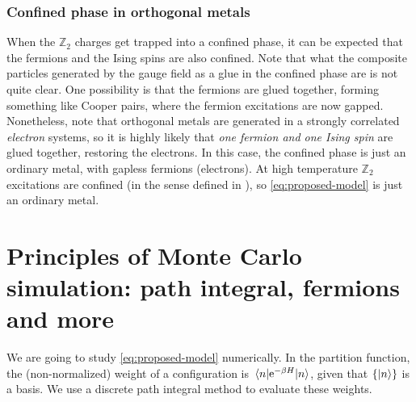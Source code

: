 \documentclass[hyperref, a4paper]{article}
\newcommand*{\ee}{\mathrm{e}}
\newcommand*{\Ztwo}{$\mathbb{Z}_2$ }
\begin{document}
\subsubsection{Confined phase in orthogonal metals}

When the \Ztwo charges get trapped into a confined phase, it can be expected that the fermions and the Ising spins are also confined.
Note that what the composite particles generated by the gauge field as a glue in the confined phase are is not quite clear.
One possibility is that the fermions are glued together, forming something like Cooper pairs, where the fermion excitations are now gapped.
Nonetheless, note that orthogonal metals are generated in a strongly correlated \emph{electron} systems, so it is highly likely that \emph{one fermion and one Ising spin} are glued together, restoring the electrons.
In this case, the confined phase is just an ordinary metal, with gapless fermions (electrons).
At high temperature \Ztwo excitations are confined (in the sense defined in ), so \eqref{eq:proposed-model} is just an ordinary metal.

\section{Principles of Monte Carlo simulation: path integral, fermions and more}

We are going to study \eqref{eq:proposed-model} numerically.
In the partition function, the (non-normalized) weight of a configuration is $\mel{n}{\ee^{-\beta H}}{n}$, given that $\{\ket{n}\}$ is a basis.
We use a discrete path integral method to evaluate these weights.
\end{document}

